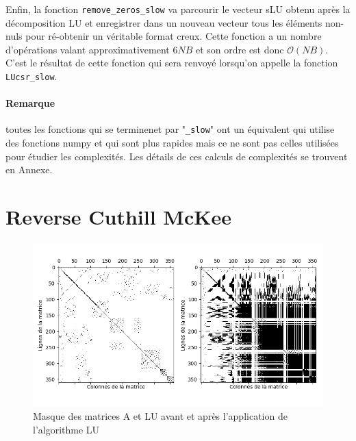 \documentclass[11pt]{article}
\begin{document}
Enfin, la fonction \texttt{remove\_zeros\_slow} va parcourir le vecteur sLU obtenu après la décomposition LU et enregistrer dans un nouveau vecteur tous les éléments non-nuls pour ré-obtenir un véritable format creux. Cette fonction a un nombre d'opérations valant approximativement $6NB$ et son ordre est donc $\mathcal{O}(NB)$. C'est le résultat de cette fonction qui sera renvoyé lorsqu'on appelle la fonction \texttt{LUcsr\_slow}.
\vspace{-8pt}

\paragraph{Remarque} toutes les fonctions qui se terminenet par "\texttt{\_slow}" ont un équivalent qui utilise des fonctions numpy et qui sont plus rapides mais ce ne sont pas celles utilisées pour étudier les complexités. Les détails de ces calculs de complexités se trouvent en Annexe.
\vspace{-8pt}


\section{Reverse Cuthill McKee}
\begin{figure}
    \centering
    \includegraphics[width=\linewidth]{mask_matrices_no_rcmk.png}
    \vspace{-1.5cm}
    \caption{Masque des matrices A et LU avant et après l'application de l'algorithme LU}
    \label{masksbeforercmk}

\end{figure}
\vspace{-10pt}
\end{document}
